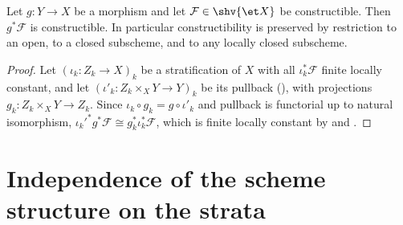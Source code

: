 \begin{proposition}
\label{prop:constructible-pullback}
\leanok
Let $g\colon Y\to X$ be a morphism and let $\mathcal F\in\shv{\et X}$ be
constructible.  Then $g^*\mathcal F$ is constructible.  In particular
constructibility is preserved by restriction to an open, to a closed
subscheme, and to any locally closed subscheme.
\end{proposition}
\begin{proof}
\leanok
Let $(\iota_k\colon Z_k\to X)_k$ be a stratification of $X$ with all
$\iota_k^*\mathcal F$ finite locally constant, and let
$(\iota'_k\colon Z_k\times_XY\to Y)_k$ be its pullback
(), with projections
$g_k\colon Z_k\times_XY\to Z_k$.  Since $\iota_k\circ g_k=g\circ\iota'_k$
and pullback is functorial up to natural isomorphism,
$\iota_k'^*g^*\mathcal F\cong g_k^*\iota_k^*\mathcal F$, which is finite
locally constant by
 and
.
\end{proof}

\section{Independence of the scheme structure on the strata}
\label{sec:constructible-invariance}

